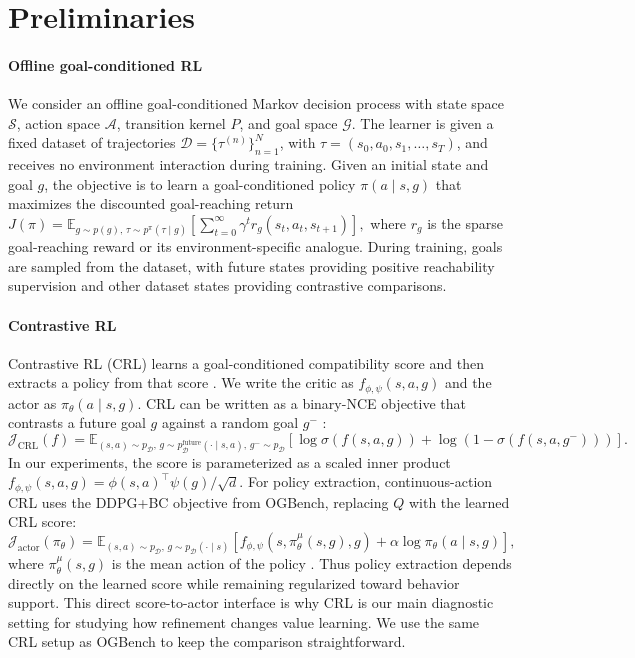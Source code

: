 \documentclass{article}
\begin{document}
\section{Preliminaries}
\label{sec:preliminaries}
\paragraph{Offline goal-conditioned RL}
We consider an offline goal-conditioned Markov decision process with state space $\mathcal{S}$, action space $\mathcal{A}$, transition kernel $P$, and goal space $\mathcal{G}$. The learner is given a fixed dataset of trajectories $\mathcal{D}=\{\tau^{(n)}\}_{n=1}^{N}$, with $\tau=(s_0,a_0,s_1,\ldots,s_T)$, and receives no environment interaction during training. Given an initial state and goal $g$, the objective is to learn a goal-conditioned policy $\pi(a\mid s,g)$ that maximizes the discounted goal-reaching return
\(
J(\pi)=
\mathbb{E}_{g \sim p(g),\, \tau \sim p^{\pi}(\tau \mid g)}
\left[
\sum_{t=0}^{\infty} \gamma^t r_g(s_t,a_t,s_{t+1})
\right],
\)
where $r_g$ is the sparse goal-reaching reward or its environment-specific analogue. During training, goals are sampled from the dataset, with future states providing positive reachability supervision and other dataset states providing contrastive comparisons.

\paragraph{Contrastive RL}
Contrastive RL (CRL) learns a goal-conditioned compatibility score and then extracts a policy from that score \citep{crl}. We write the critic as $f_{\phi,\psi}(s,a,g)$ and the actor as $\pi_\theta(a\mid s,g)$. CRL can be written as a binary-NCE objective that contrasts a future goal $g$ against a random goal $g^-$ \citep{ma_collins_binary_nce, crl}:
\begin{equation}
\mathcal{J}_{\mathrm{CRL}}(f)
=
\mathbb{E}_{(s,a)\sim p_{\mathcal{D}},\,g\sim p_{\mathcal{D}}^{\mathrm{future}}(\cdot\mid s,a),\,g^-\sim p_{\mathcal{D}}}
\left[
\log\sigma(f(s,a,g))+\log(1-\sigma(f(s,a,g^-)))
\right].
\end{equation}
In our experiments, the score is parameterized as a scaled inner product
\(f_{\phi,\psi}(s,a,g)=\phi(s,a)^\top\psi(g)/\sqrt{d}\).
For policy extraction, continuous-action CRL uses the DDPG+BC objective from OGBench, replacing $Q$ with the learned CRL score:
\begin{equation}
\mathcal{J}_{\mathrm{actor}}(\pi_\theta)
=
\mathbb{E}_{(s,a)\sim p_{\mathcal{D}},\,g\sim p_{\mathcal{D}}(\cdot\mid s)}
\left[
f_{\phi,\psi}(s,\pi_\theta^\mu(s,g),g)
+ \alpha \log \pi_\theta(a\mid s,g)
\right],
\end{equation}
where $\pi_\theta^\mu(s,g)$ is the mean action of the policy \citep{td3bc, ogbench}. Thus policy extraction depends directly on the learned score while remaining regularized toward behavior support. This direct score-to-actor interface is why CRL is our main diagnostic setting for studying how refinement changes value learning. We use the same CRL setup as OGBench to keep the comparison straightforward.
\end{document}
